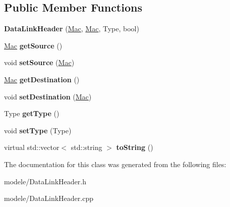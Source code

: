 \subsection*{Public Member Functions}
\begin{DoxyCompactItemize}
\item 
\hypertarget{class_data_link_header_aa949639e2ec6c6f5c50b73a957f3fee0}{{\bfseries Data\-Link\-Header} (\hyperlink{class_mac}{Mac}, \hyperlink{class_mac}{Mac}, Type, bool)}\label{class_data_link_header_aa949639e2ec6c6f5c50b73a957f3fee0}

\item 
\hypertarget{class_data_link_header_a91e05b48b18ba1ebaf5d9130372910c1}{\hyperlink{class_mac}{Mac} {\bfseries get\-Source} ()}\label{class_data_link_header_a91e05b48b18ba1ebaf5d9130372910c1}

\item 
\hypertarget{class_data_link_header_a3faabf7c60938c0a2f7a697d4700defc}{void {\bfseries set\-Source} (\hyperlink{class_mac}{Mac})}\label{class_data_link_header_a3faabf7c60938c0a2f7a697d4700defc}

\item 
\hypertarget{class_data_link_header_a001eec987aa62f5fe933fc1dd4f898cd}{\hyperlink{class_mac}{Mac} {\bfseries get\-Destination} ()}\label{class_data_link_header_a001eec987aa62f5fe933fc1dd4f898cd}

\item 
\hypertarget{class_data_link_header_a5cafc6ca59567e8b224a87ae6c7a5173}{void {\bfseries set\-Destination} (\hyperlink{class_mac}{Mac})}\label{class_data_link_header_a5cafc6ca59567e8b224a87ae6c7a5173}

\item 
\hypertarget{class_data_link_header_a31134e69a4c3e6d0ff8579f651349871}{Type {\bfseries get\-Type} ()}\label{class_data_link_header_a31134e69a4c3e6d0ff8579f651349871}

\item 
\hypertarget{class_data_link_header_a2740c1af93aee29118534bd2a0dd1102}{void {\bfseries set\-Type} (Type)}\label{class_data_link_header_a2740c1af93aee29118534bd2a0dd1102}

\item 
\hypertarget{class_data_link_header_a56af13c3cf545c2be4ab81f46b5494ce}{virtual std\-::vector$<$ std\-::string $>$ {\bfseries to\-String} ()}\label{class_data_link_header_a56af13c3cf545c2be4ab81f46b5494ce}

\end{DoxyCompactItemize}


The documentation for this class was generated from the following files\-:\begin{DoxyCompactItemize}
\item 
modele/Data\-Link\-Header.\-h\item 
modele/Data\-Link\-Header.\-cpp\end{DoxyCompactItemize}
